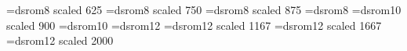 \fi
\ifx\ifLMTS\relax%
\immediate{}

\fi
\ifx\ifDS\relax%
\immediate{}
\font\fiveds=dsrom8 scaled 625
\font\sixds=dsrom8 scaled 750
\font\sevends=dsrom8 scaled 875
\font\eightds=dsrom8
\font\nineds=dsrom10 scaled 900
\font\tends=dsrom10
\font\twelveds=dsrom12
\font\fourteends=dsrom12 scaled 1167
\font\twentyds=dsrom12 scaled 1667
\font\twentyfourds=dsrom12 scaled 2000
\fi
\newfam\mibfam
\newfam\bsyfam
\newfam\ssfam
\newfam\cscfam
\ifx\ifDS\relax%

\fi
\def\ds{}
